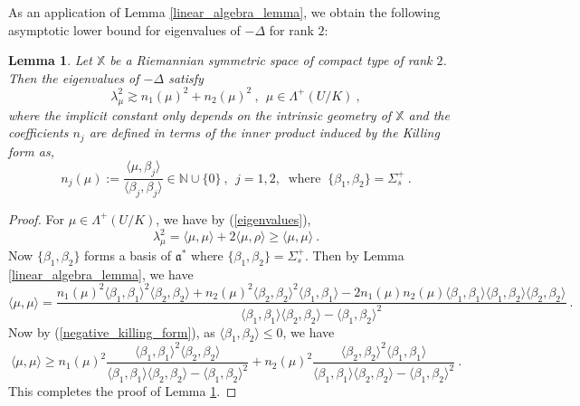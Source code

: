 \documentclass[12pt]{amsart}
\newtheorem{lemma}[theorem]{Lemma}
\theoremstyle{definition}
\newcommand{\N}{\mathbb N}%
\newcommand{\X}{\mathbb X}%
\numberwithin{equation}{section}
\begin{document}
As an application of Lemma \ref{linear_algebra_lemma}, we obtain the following asymptotic lower bound for eigenvalues of $-\Delta$ for rank $2$:
\begin{lemma} \label{rank2_eigenvalue}
Let $\X$ be a Riemannian symmetric space of compact type of rank $2$. Then the eigenvalues of $-\Delta$ satisfy
\begin{equation*}
\lambda_\mu^2 \gtrsim n_1(\mu)^2 + n_2(\mu)^2\:,\:\: \mu  \in \Lambda^+(U/K)\:,
\end{equation*}
where the implicit constant only depends on the intrinsic geometry of $\X$ and the coefficients $n_j$ are defined in terms of the inner product induced by the Killing form as,
\begin{equation*}
n_j(\mu):= \frac{\langle \mu, \beta_j \rangle}{\langle \beta_j, \beta_j \rangle} \in \N \cup \{0\}\:,\:\:j=1,2,\:\text{ where }\: \{\beta_1, \beta_2\} = \Sigma^+_s\:.
\end{equation*}
\end{lemma}
\begin{proof}
For $\mu \in \Lambda^+(U/K)$, we have by (\ref{eigenvalues}),
\begin{equation*}
\lambda^2_\mu = \langle \mu,\mu \rangle + 2 \langle \mu, \rho \rangle \ge \langle \mu,\mu \rangle\:.
\end{equation*}
Now $\{\beta_1,\beta_2\}$ forms a basis of $\mathfrak{a}^*$ where $\{\beta_1, \beta_2\} = \Sigma^+_s$. Then by Lemma \ref{linear_algebra_lemma}, we have
\begin{equation*}
\langle \mu,\mu \rangle = \frac{n_1(\mu)^2 \langle \beta_1,\beta_1 \rangle^2 \langle \beta_2,\beta_2 \rangle + n_2(\mu)^2 \langle \beta_2,\beta_2 \rangle^2 \langle \beta_1,\beta_1 \rangle - 2n_1(\mu) n_2(\mu) \langle \beta_1,\beta_1 \rangle \langle \beta_1,\beta_2 \rangle \langle \beta_2,\beta_2 \rangle }{\langle \beta_1,\beta_1 \rangle \langle \beta_2,\beta_2 \rangle - \langle \beta_1,\beta_2 \rangle^2}\:.
\end{equation*}
Now by (\ref{negative_killing_form}), as $\langle \beta_1, \beta_2 \rangle \le 0$, we have 
\begin{equation*}
\langle \mu,\mu \rangle \ge n_1(\mu)^2\frac{ \langle \beta_1,\beta_1 \rangle^2 \langle \beta_2,\beta_2 \rangle}{\langle \beta_1,\beta_1 \rangle \langle \beta_2,\beta_2 \rangle - \langle \beta_1,\beta_2 \rangle^2} + n_2(\mu)^2 \frac{\langle \beta_2,\beta_2 \rangle^2 \langle \beta_1,\beta_1 \rangle }{\langle \beta_1,\beta_1 \rangle \langle \beta_2,\beta_2 \rangle - \langle \beta_1,\beta_2 \rangle^2}\:.
\end{equation*} 
This completes the proof of Lemma \ref{rank2_eigenvalue}.
\end{proof}
\end{document}
